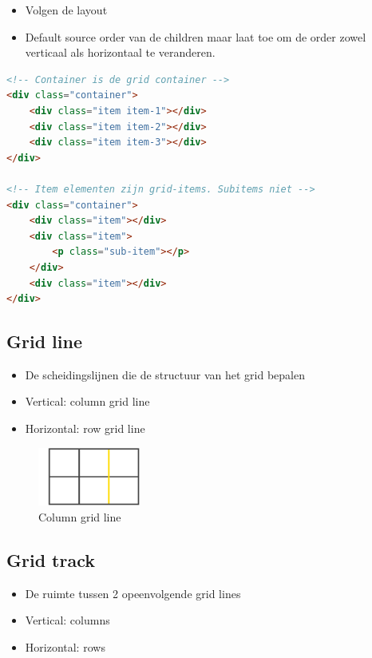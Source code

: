 \documentclass{article}
\begin{document}
\begin{itemize}
    \item Volgen de layout
    \item Default source order van de children maar laat toe om de order zowel verticaal als horizontaal te veranderen.
\end{itemize}

\begin{lstlisting}[language=HTML]
<!-- Container is de grid container -->
<div class="container">
    <div class="item item-1"></div>
    <div class="item item-2"></div>
    <div class="item item-3"></div>
</div>

<!-- Item elementen zijn grid-items. Subitems niet -->
<div class="container">
    <div class="item"></div>
    <div class="item">
        <p class="sub-item"></p>
    </div>
    <div class="item"></div>
</div>
\end{lstlisting}

\subsection{Grid line}

\begin{itemize}
    \item De scheidingslijnen die de structuur van het grid bepalen
    \item Vertical: column grid line
    \item Horizontal: row grid line
\end{itemize}

\begin{figure}[H]
    \centering
    \includegraphics[width=0.3\textwidth]{grid-line-column.png}
    \caption{Column grid line}
\end{figure}

\subsection{Grid track}

\begin{itemize}
    \item De ruimte tussen 2 opeenvolgende grid lines
    \item Vertical: columns
    \item Horizontal: rows
\end{itemize}
\end{document}
